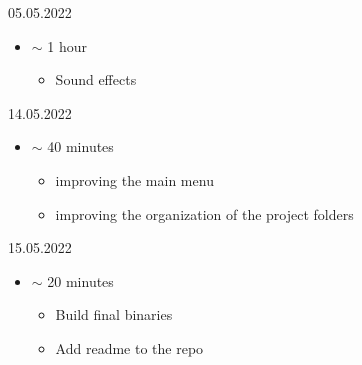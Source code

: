 \documentclass{article}
\begin{document}
05.05.2022
\begin{itemize}
	\item $\sim$ 1 hour
	\begin{itemize}
		\item Sound effects
	\end{itemize}
\end{itemize}

14.05.2022
\begin{itemize}
	\item $\sim$ 40 minutes
	\begin{itemize}
		\item improving the main menu
		\item improving the organization of the project folders
	\end{itemize}
\end{itemize}

15.05.2022
\begin{itemize}
	\item $\sim$ 20 minutes
	\begin{itemize}
		\item Build final binaries
		\item Add readme to the repo
	\end{itemize}
\end{itemize}
\end{document}
